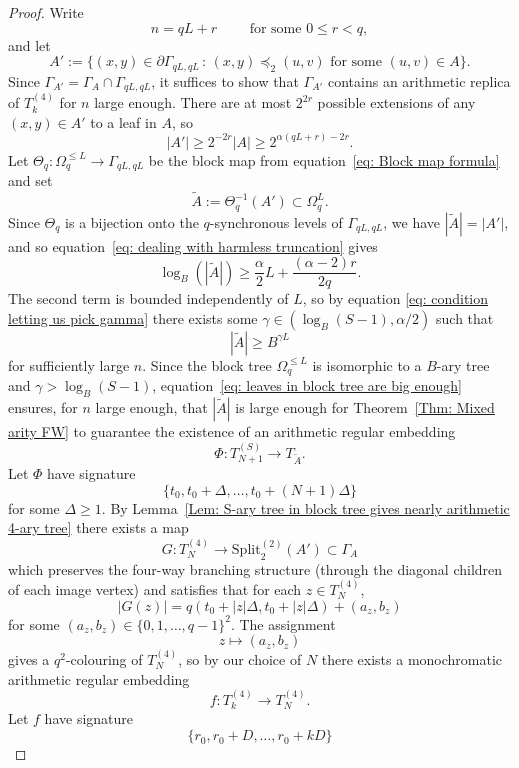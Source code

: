 \documentclass[11pt]{amsart}
\newcommand\labs[1]{\left\lvert#1\right\rvert}
\newcommand{\Split}{\mathrm{Split}}
\renewcommand{\leq}{\leqslant}
\renewcommand{\geq}{\geqslant}
\theoremstyle{plain}
\theoremstyle{definition}
\theoremstyle{remark}
\begin{document}
\begin{proof}
Write
\[ n =qL + r \qquad \text{ for some } 0\leq r < q,\]
and let
\[ A':= \{(x,y) \in \partial\Gamma_{qL,qL} \, : \, (x,y)\preceq_2 (u,v) \text{ for some }(u,v) \in A\}.\]
Since $\Gamma_{A'} = \Gamma_A\cap \Gamma_{qL,qL}$, it suffices to show that $\Gamma_{A'}$ contains an arithmetic replica of $T_k^{(4)}$ for $n$ large enough.
There are at most $2^{2r}$ possible extensions of any $(x,y)\in A'$ to a leaf in $A$, so
\begin{equation}\label{eq: dealing with harmless truncation}
\labs{A'} \geq 2^{-2r} \labs{A} \geq 2^{\alpha (qL+r) - 2r}.
\end{equation}
Let $\Theta_q: \Omega_q^{\leq L} \to \Gamma_{qL,qL}$ be the block map from equation~\eqref{eq: Block map formula} and set
\[ \tilde{A}:= \Theta_q^{-1}(A') \subset \Omega_q^{L}.\] 
Since $\Theta_q$ is a bijection onto the $q$-synchronous levels of $\Gamma_{qL,qL}$, we have $|\tilde{A}| = \labs{A'}$, and so equation~\eqref{eq: dealing with harmless truncation} gives
\[ \log_B\left(|\tilde{A}|\right) \geq \frac{\alpha}{2}L + \frac{(\alpha-2)r}{2q}.\]
The second term is bounded independently of $L$, so by equation \eqref{eq: condition letting us pick gamma} there exists some $\gamma \in (\log_B(S-1),\alpha/2)$ such that
\begin{equation}\label{eq: leaves in block tree are big enough}
 |\tilde{A}| \geq B^{\gamma L}
\end{equation}
for sufficiently large $n$. Since the block tree $\Omega_q^{\leq L}$ is isomorphic to a $B$-ary tree and $\gamma > \log_B(S-1)$, equation~\eqref{eq: leaves in block tree are big enough} ensures, for $n$ large enough, that $|\tilde{A}|$ is large enough for Theorem~\ref{Thm: Mixed arity FW} to guarantee the existence of an arithmetic regular embedding
\[ \Phi: T_{N+1}^{(S)} \to T_{\tilde{A}}.\]
Let $\Phi$ have signature
\[ \{t_0,t_0 + \Delta, \ldots, t_0 + (N+1)\Delta\}\]
for some $\Delta\geq 1$. By Lemma~\ref{Lem: S-ary tree in block tree gives nearly arithmetic 4-ary tree} there exists a map
\[ G: T_N^{(4)} \to \Split_2^{(2)}(A') \subset \Gamma_A\]
which preserves the four-way branching structure (through the diagonal children of each image vertex) and satisfies that for each $z \in T_N^{(4)}$,
\[ \labs{G(z)} = q(t_0 + \labs{z}\Delta,t_0 + \labs{z}\Delta) + (a_z,b_z)\]
for some $(a_z,b_z)\in \{0,1,\ldots,q-1\}^2$. The assignment
\[ z \mapsto (a_z,b_z)\]
gives a $q^2$-colouring of $T_N^{(4)}$, so by our choice of $N$ there exists a monochromatic arithmetic regular embedding
\[ f: T_k^{(4)} \to T_N^{(4)}.\]
Let $f$ have signature
\[ \{r_0,r_0 +D, \ldots, r_0 + kD\}\]

\end{proof}
\end{document}
